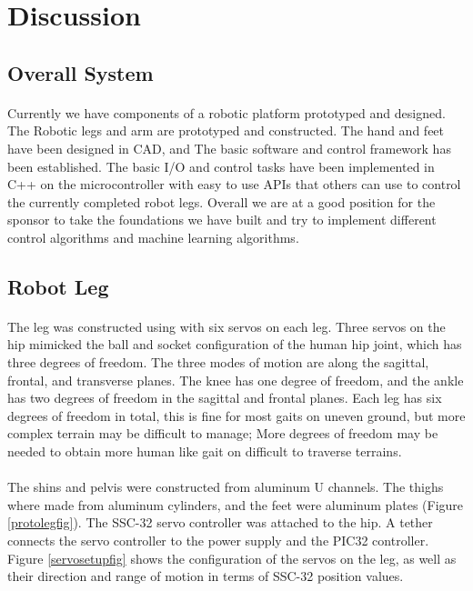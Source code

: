 \documentclass[titlepage,letterpaper,12pt]{article}
\begin{document}
\section{Discussion}
\subsection{Overall System}
\paragraph{}Currently we have components of a robotic platform prototyped and
designed. The Robotic legs and arm are prototyped and constructed. The hand and
feet have been designed in CAD, and The basic software and control framework has
been established. The basic I/O and control tasks have been implemented in C++
on the microcontroller with easy to use APIs that others can use to control the
currently completed robot legs. Overall we are at a good position for the
sponsor to take the foundations we have built and try to implement different
control algorithms and machine learning algorithms. 

\subsection{Robot Leg}
\paragraph{}The leg was constructed using with six servos on each leg. Three
servos on the hip mimicked the ball and socket configuration of the human hip
joint, which has three degrees of freedom\cite{SiasJr1990}. The three modes of
motion are along the sagittal, frontal, and transverse planes\cite{Fiscell2005}.
The knee has one degree of freedom, and the ankle has two degrees of freedom in
the sagittal and frontal planes. Each leg has six degrees of freedom in total,
this is fine for most gaits on uneven ground, but more complex terrain may be 
difficult to manage; More degrees of freedom may be needed to obtain more human
like gait on difficult to traverse terrains\cite{SiasJr1990}.

\paragraph{}The shins and pelvis were constructed from aluminum U channels. The
thighs where made from aluminum cylinders, and the feet were aluminum plates
(Figure \ref{protolegfig}). The SSC-32 servo controller was attached to the hip.
A tether connects the servo controller to the power supply and the PIC32
controller. Figure \ref{servosetupfig} shows the configuration of the servos on the leg, as
well as their direction and range of motion in terms of SSC-32 position values.
\end{document}

